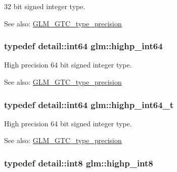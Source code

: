 32 bit signed integer type. \begin{Desc}
\item[See also:]\hyperlink{group__gtc__type__precision}{GLM\_\-GTC\_\-type\_\-precision} \end{Desc}
\hypertarget{group__gtc__type__precision_g7ffb27943e9569800979081bc548621c}{
\subsubsection[highp\_\-int64]{\setlength{\rightskip}{0pt plus 5cm}typedef detail::int64 {\bf glm::highp\_\-int64}}}
\label{group__gtc__type__precision_g7ffb27943e9569800979081bc548621c}


High precision 64 bit signed integer type. \begin{Desc}
\item[See also:]\hyperlink{group__gtc__type__precision}{GLM\_\-GTC\_\-type\_\-precision} \end{Desc}
\hypertarget{group__gtc__type__precision_g0f5186bde44471133b08057cae8a51ac}{
\subsubsection[highp\_\-int64\_\-t]{\setlength{\rightskip}{0pt plus 5cm}typedef detail::int64 {\bf glm::highp\_\-int64\_\-t}}}
\label{group__gtc__type__precision_g0f5186bde44471133b08057cae8a51ac}


High precision 64 bit signed integer type. \begin{Desc}
\item[See also:]\hyperlink{group__gtc__type__precision}{GLM\_\-GTC\_\-type\_\-precision} \end{Desc}
\hypertarget{group__gtc__type__precision_g57c86999e666760c304453f9bfdc09d1}{
\subsubsection[highp\_\-int8]{\setlength{\rightskip}{0pt plus 5cm}typedef detail::int8 {\bf glm::highp\_\-int8}}}
\label{group__gtc__type__precision_g57c86999e666760c304453f9bfdc09d1}



